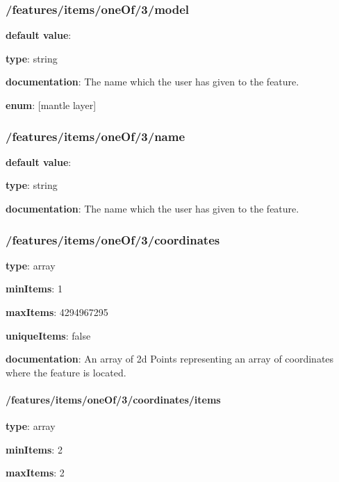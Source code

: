 \subsubsection{/features/items/oneOf/3/model} \begin{itemized}
\item {\bf default value}: 
\item {\bf type}: string
\item {\bf documentation}: The name which the user has given to the feature.
\item {\bf enum}: [mantle layer]\end{itemized}\subsubsection{/features/items/oneOf/3/name} \begin{itemized}
\item {\bf default value}: 
\item {\bf type}: string
\item {\bf documentation}: The name which the user has given to the feature.
\end{itemized}\subsubsection{/features/items/oneOf/3/coordinates} \begin{itemized}
\item {\bf type}: array
\item {\bf minItems}: 1
\item {\bf maxItems}: 4294967295
\item {\bf uniqueItems}: false
\item {\bf documentation}: An array of 2d Points representing an array of coordinates where the feature is located.
\paragraph{/features/items/oneOf/3/coordinates/items} \begin{itemized}
\item {\bf type}: array
\item {\bf minItems}: 2
\item {\bf maxItems}: 2

\end{itemized}
\end{itemized}
